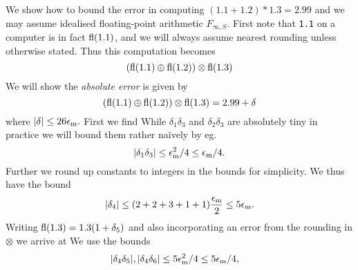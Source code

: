 \begin{example} We show how to bound the error in computing $(1.1 + 1.2) * 1.3 = 2.99$ and we may assume idealised floating-point arithmetic $F_{\ensuremath{\infty},S}$. First note that \texttt{1.1} on a computer is in fact ${\rm fl}(1.1)$, and we will always assume nearest rounding unless otherwise stated. Thus this computation becomes
\[
({\rm fl}(1.1) \ensuremath{\oplus} {\rm fl}(1.2)) \ensuremath{\otimes} {\rm fl}(1.3)
\]
We will show the \emph{absolute error} is given by
\[
({\rm fl}(1.1) \ensuremath{\oplus} {\rm fl}(1.2)) \ensuremath{\otimes} {\rm fl}(1.3) = 2.99 + \ensuremath{\delta}
\]
where $|\ensuremath{\delta}| \ensuremath{\leq}  26 \ensuremath{\epsilon}_{\rm m}.$ First we find
While $\ensuremath{\delta}_1 \ensuremath{\delta}_3$ and $\ensuremath{\delta}_2 \ensuremath{\delta}_3$ are absolutely tiny in practice we will bound them rather naïvely by eg.
\[
|\ensuremath{\delta}_1 \ensuremath{\delta}_3| \ensuremath{\leq} \ensuremath{\epsilon}_{\rm m}^2/4 \ensuremath{\leq} \ensuremath{\epsilon}_{\rm m}/4.
\]
Further we round up constants to integers in the bounds for simplicity. We thus have the bound
\[
|\ensuremath{\delta}_4| \ensuremath{\leq} (2+2+3+1+1) {\ensuremath{\epsilon}_{\rm m} \over 2} \ensuremath{\leq} 5\ensuremath{\epsilon}_{\rm m}.
\]
Writing ${\rm fl}(1.3) = 1.3 (1+\ensuremath{\delta}_5)$ and also incorporating an error from the rounding in $\ensuremath{\otimes}$ we arrive at
We use the bounds
\begin{align*}
|\ensuremath{\delta}_4 \ensuremath{\delta}_5|, |\ensuremath{\delta}_4 \ensuremath{\delta}_6| &\ensuremath{\leq} 5 \ensuremath{\epsilon}_{\rm m}^2/4 \ensuremath{\leq} 5 \ensuremath{\epsilon}_{\rm m}/4,  \cr

\end{align*}
\end{example}
